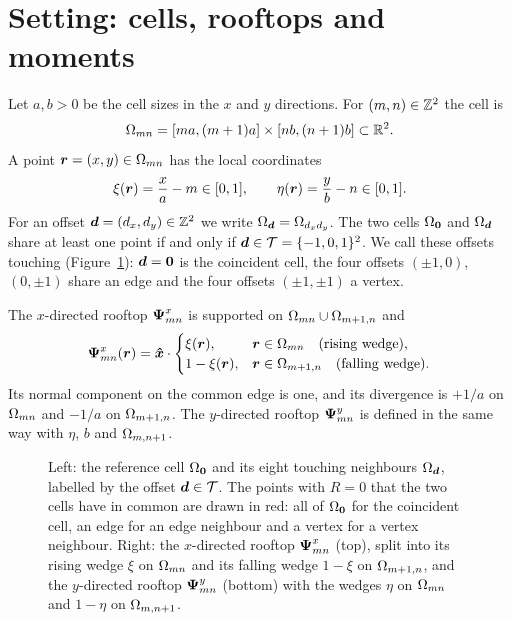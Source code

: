 \section{Setting: cells, rooftops and moments}
\label{sec:setting}

 Let $a,b>0$ be the cell sizes in the $x$ and $y$ directions. For
$(m,n)\in\mathbb{Z}^2$ the cell is
\begin{equation}
    \Omega_{mn} = [ma,(m+1)a]\times[nb,(n+1)b] \subset \mathbb{R}^2 .
\end{equation}
A point $\vb*{r}=(x,y)\in\Omega_{mn}$ has the local coordinates
\begin{equation}
    \xi(\vb*{r}) = \frac{x}{a}-m \in[0,1], \qquad \eta(\vb*{r}) = \frac{y}{b}-n\in[0,1].
\end{equation}
For an offset $\vb*{d}=(d_x,d_y)\in\mathbb{Z}^2$ we write $\Omega_{\vb*{d}}=\Omega_{d_xd_y}$. The two cells $\Omega_{\vb*{0}}$ and $\Omega_{\vb*{d}}$ share
at least one point if and only if $\vb*{d}\in\mathcal{T}=\{-1,0,1\}^2$. We call these offsets touching
(Figure~\ref{fig:touching}): $\vb*{d}=\vb*{0}$ is the coincident cell, the four offsets $(\pm1,0)$, $(0,\pm1)$ share an edge
and the four offsets $(\pm1,\pm1)$ a vertex.

 The $x$-directed rooftop $\vb*{\Psi}^x_{mn}$ is supported on
$\Omega_{mn}\cup\Omega_{m+1,n}$ and
\begin{equation}
    \vb*{\Psi}^x_{mn}(\vb*{r}) = \vb*{\hat{x}}\cdot
    \begin{cases}
        \xi(\vb*{r}), & \vb*{r}\in\Omega_{mn} \quad\text{(rising wedge)},\\
        1-\xi(\vb*{r}), & \vb*{r}\in\Omega_{m+1,n} \quad\text{(falling wedge)}.
    \end{cases}
\end{equation}
Its normal component on the common edge is one, and its divergence is $+1/a$ on $\Omega_{mn}$ and $-1/a$ on $\Omega_{m+1,n}$.
The $y$-directed rooftop $\vb*{\Psi}^y_{mn}$ is defined in the same way with $\eta$, $b$ and $\Omega_{m,n+1}$.

\begin{figure}[ht]
    \centering
    
    \caption{Left: the reference cell $\Omega_{\vb*{0}}$ and its eight touching neighbours $\Omega_{\vb*{d}}$, labelled by the offset
    $\vb*{d}\in\mathcal{T}$. The points with $R=0$ that the two cells have in common are drawn in red: all of
    $\Omega_{\vb*{0}}$ for the coincident cell, an edge for an edge neighbour and a vertex for a vertex neighbour. Right: the
    $x$-directed rooftop $\vb*{\Psi}^x_{mn}$ (top), split into its rising wedge $\xi$ on $\Omega_{mn}$ and its falling wedge
    $1-\xi$ on $\Omega_{m+1,n}$, and the $y$-directed rooftop $\vb*{\Psi}^y_{mn}$ (bottom) with the wedges $\eta$ on $\Omega_{mn}$
    and $1-\eta$ on $\Omega_{m,n+1}$.}
    \label{fig:touching}
\end{figure}

